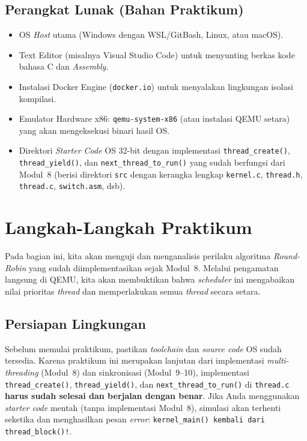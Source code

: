 \subsection{Perangkat Lunak (Bahan Praktikum)}
\begin{itemize}
	\item OS \textit{Host} utama (Windows dengan WSL/GitBash, Linux, atau macOS).
	\item Text Editor (misalnya Visual Studio Code) untuk menyunting berkas kode bahasa C dan \textit{Assembly}.
	\item Instalasi Docker Engine (\texttt{docker.io}) untuk menyalakan lingkungan isolasi kompilasi.
	\item Emulator Hardware x86: \texttt{qemu-system-x86} (atau instalasi QEMU setara) yang akan mengeksekusi binari hasil OS.
	\item Direktori \textit{Starter Code} OS 32-bit dengan implementasi \texttt{thread\_create()}, \texttt{thread\_yield()}, dan \texttt{next\_thread\_to\_run()} yang sudah berfungsi dari Modul~8 (berisi direktori \texttt{src} dengan kerangka lengkap \texttt{kernel.c}, \texttt{thread.h}, \texttt{thread.c}, \texttt{switch.asm}, dsb).
\end{itemize}

\newpage
\section{Langkah-Langkah Praktikum}

Pada bagian ini, kita akan menguji dan menganalisis perilaku algoritma \textit{Round-Robin} yang sudah diimplementasikan sejak Modul~8. Melalui pengamatan langsung di QEMU, kita akan membuktikan bahwa \textit{scheduler} ini mengabaikan nilai prioritas \textit{thread} dan memperlakukan semua \textit{thread} secara setara.

\subsection{Persiapan Lingkungan}
\label{sec:m11-persiapan}

Sebelum memulai praktikum, pastikan \textit{toolchain} dan \textit{source code} OS sudah tersedia.
Karena praktikum ini merupakan lanjutan dari implementasi \textit{multi-threading} (Modul~8) dan sinkronisasi (Modul~9--10), implementasi \texttt{thread\_create()}, \texttt{thread\_yield()}, dan \texttt{next\_thread\_to\_run()} di \texttt{thread.c} \textbf{harus sudah selesai dan berjalan dengan benar}. Jika Anda menggunakan \textit{starter code} mentah (tanpa implementasi Modul~8), simulasi akan terhenti seketika dan menghasilkan pesan \textit{error}: \texttt{kernel\_main() kembali dari thread\_block()!}.

